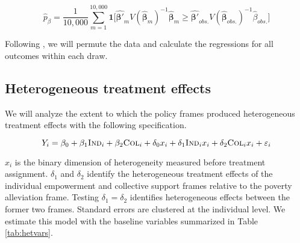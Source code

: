 \documentclass[11pt, a4paper]{article}\usepackage[]{graphicx}\usepackage[]{color}
\begin{document}
        \begin{equation} \label{eq:exactp}
            \hat{p}_{\beta} =  \frac{1}{10,000}\sum_{m=1}^{10,000} \mathbf{1} \Big [ \mathbf{\hat{\beta'}}_m V(\mathbf{\hat{\beta}}_m)^{-1} \mathbf{\hat{\beta}}_m \geq \mathbf{\hat{\beta'}}_{obs.} V(\mathbf{\hat{\beta}}_{obs.})^{-1} \hat{\beta}_{obs.} \Big ]
        \end{equation}

        Following \textcite{young_channeling_2015}, we will permute the data and calculate the regressions for all outcomes within each draw.

    \subsection{Heterogeneous treatment effects}

        We will analyze the extent to which the policy frames produced heterogeneous treatment effects with the following specification.

        \begin{equation}
            Y_{i} = \beta_{0} + \beta_{1}\text{\textsc{Ind}}_{i} + \beta_{2}\text{\textsc{Col}}_{i} + \delta_{0} x_i + \delta_{1}\text{\textsc{Ind}}_{i} x_i + \delta_{2}\text{\textsc{Col}}_{i} x_i + \varepsilon_{i}
        \label{eq:heteffect} \end{equation}

        $x_{i}$ is the binary dimension of heterogeneity measured before treatment assignment. $\delta_{1}$ and $\delta_{2}$ identify the heterogeneous treatment effects of the individual empowerment and collective support frames relative to the poverty alleviation frame. Testing $\delta_{1} = \delta_{2}$ identifies heterogeneous effects between the former two frames. Standard errors are clustered at the individual level. We estimate this model with the baseline variables summarized in Table \ref{tab:hetvars}.

        \begin{table}[h]
        \centering
        \caption{Dimensions of heterogeneity}
        \label{tab:hetvars}
        \end{table}
\end{document}
